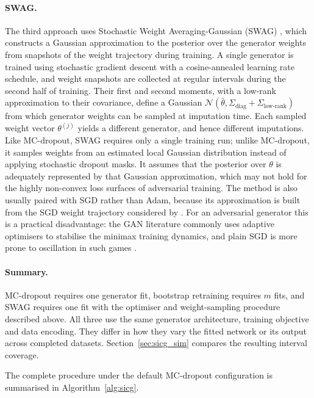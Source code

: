 \paragraph{SWAG.} The third approach uses Stochastic Weight Averaging-Gaussian (SWAG) \citep{maddox2019simple}, which constructs a Gaussian approximation to the posterior over the generator weights from snapshots of the weight trajectory during training. A single generator is trained using stochastic gradient descent with a cosine-annealed learning rate schedule, and weight snapshots are collected at regular intervals during the second half of training. Their first and second moments, with a low-rank approximation to their covariance, define a Gaussian $\mathcal{N}(\bar{\theta}, \Sigma_{\text{diag}} + \Sigma_{\text{low-rank}})$ from which generator weights can be sampled at imputation time. Each sampled weight vector $\theta^{(j)}$ yields a different generator, and hence different imputations. Like MC-dropout, SWAG requires only a single training run; unlike MC-dropout, it samples weights from an estimated local Gaussian distribution instead of applying stochastic dropout masks. It assumes that the posterior over $\theta$ is adequately represented by that Gaussian approximation, which may not hold for the highly non-convex loss surfaces of adversarial training. The method is also usually paired with SGD rather than Adam, because its approximation is built from the SGD weight trajectory considered by \citet{maddox2019simple}. For an adversarial generator this is a practical disadvantage: the GAN literature commonly uses adaptive optimisers to stabilise the minimax training dynamics, and plain SGD is more prone to oscillation in such games \citep{mescheder2018which, salimans2016improved}.

\paragraph{Summary.} MC-dropout requires one generator fit, bootstrap retraining requires $m$ fits, and SWAG requires one fit with the optimiser and weight-sampling procedure described above. All three use the same generator architecture, training objective and data encoding. They differ in how they vary the fitted network or its output across completed datasets. Section~\ref{sec:sicg_sim} compares the resulting interval coverage.

The complete procedure under the default MC-dropout configuration is summarised in Algorithm~\ref{alg:sicg}.

